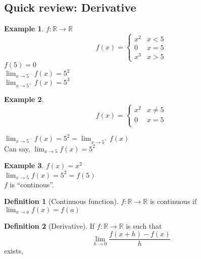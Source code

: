 \documentclass[twocolumn,20pt,fleqn]{extarticle}
\theoremstyle{plain}
\theoremstyle{definition}
\newtheorem*{definition}{Definition}
\newtheorem*{example}{Example}
\theoremstyle{remark}
\begin{document}
\subsection{Quick review: Derivative}
\begin{example}
  $f : \mathbb{R}\to \mathbb{R}$
  \[f(x) =
      \begin{cases}
        x^2 & x < 5\\
        0 & x = 5\\
        x^3 & x > 5
      \end{cases}
      \]
      $f(5)=0$\\
$\displaystyle\lim_{x \to 5^-} f(x)  = 5^2$\\
$\displaystyle\lim_{x \to 5^+} f(x)  = 5^3$
\end{example}


\begin{example}
  \[f(x) =
      \begin{cases}
        x^2 & x  \neq  5\\
        0 & x = 5\\
        
      \end{cases}
      \]
      
      


$\displaystyle\lim_{x \to 5^-} f(x) = 5^2  = \displaystyle\lim_{x \to 5^+} f(x)$\\
Can say, $\displaystyle\lim_{x \to 5} f(x) = 5^2$
\end{example}

\newpage
\begin{example}
$f(x) = x^2$\\
$\displaystyle\lim_{x \to 5} f(x) = 5^2 = f(5)$\\
$f$ is ``continous''.
\end{example}

\begin{definition}[Continuous function]
$f : \mathbb{R} \to \mathbb{R}$ is continuous if $\displaystyle\lim_{x \to a} f(x) = f(a)$
\end{definition}

\begin{definition}[Derivative]
  If $f : \mathbb{R}\to \mathbb{R}$ is such that
  \[\displaystyle\lim_{h\to 0}\frac{f(x+h) - f(x)}{h}\] exists,\end{definition}


\clearpage
\end{document}
